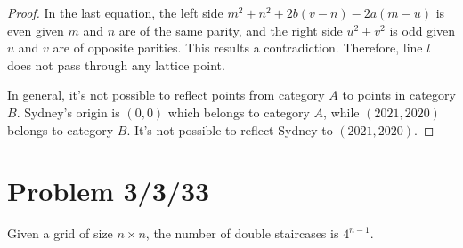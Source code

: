 \documentclass[11pt, oneside]{article}   	%
\begin{document}
\begin{proof}
In the last equation, the left side $m^2+n^2+2b(v-n)-2a(m-u)$ is even given $m$ and $n$ are of the same parity, and the right side $u^2 +v^2$ is odd given $u$ and $v$ are of opposite parities. This results a contradiction. Therefore, line $l$ does not pass through any lattice point.

In general, it's not possible to reflect points from category $A$ to points in category $B$. Sydney's origin is $(0, 0)$ which belongs to category $A$, while $(2021, 2020)$ belongs to category $B$. It's not possible to reflect Sydney to $(2021, 2020)$.
\end{proof}


\newpage
\section{Problem 3/3/33}
Given a grid of size $n\times n$, the number of double staircases is $4^{n-1}$.\\
\end{document}
